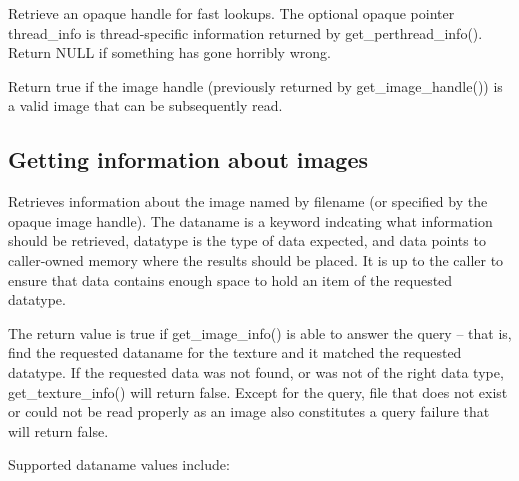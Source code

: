 \NEW %
Retrieve an opaque handle for fast \ImageCache lookups.  The optional opaque
pointer {\cf thread_info} is thread-specific information returned by
{\cf get_perthread_info()}.  Return {\cf NULL} if something has gone
horribly wrong.
\apiend

\NEW %
Return true if the image handle (previously returned by
{\cf get_image_handle()}) is a valid image that can be subsequently read.
\apiend


\subsection{Getting information about images}
\label{sec:imagecache:api:getimageinfo}
\label{sec:imagecache:api:getimagespec}


Retrieves information about the image named by {\cf filename} (or specified
by the opaque image handle).
The {\cf dataname} is a keyword indcating what information should
be retrieved, {\cf datatype} is the type of data expected, and
{\cf data} points to caller-owned memory where the results should be
placed.  It is up to the caller to ensure that {\cf data} contains
enough space to hold an item of the requested {\cf datatype}.

The return value is {\cf true} if {\cf get_image_info()} is able to answer
the query -- that is, find the requested {\cf dataname} for the texture and
it matched the requested {\cf datatype}.  If the requested data was not
found, or was not of the right data type, {\cf get_texture_info()} will
return {\cf false}. Except for the  query, file that does not
exist or could not be read properly as an image also constitutes a query
failure that will return {\cf false}.

Supported {\cf dataname} values include:

